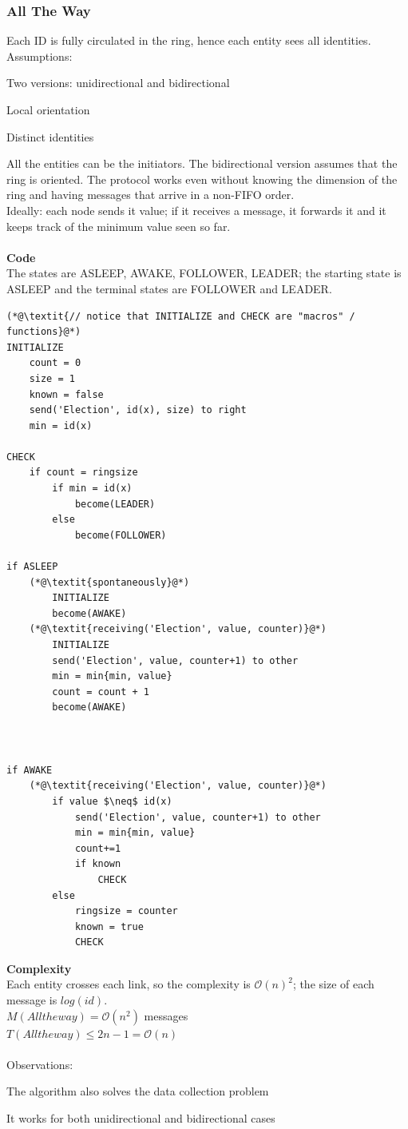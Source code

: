 \documentclass[paper=a4, fontsize=11pt]{scrartcl} %
\numberwithin{equation}{section} %
\numberwithin{figure}{section} %
\numberwithin{table}{section} %
\begin{document}
\subsubsection*{All The Way}
Each ID is fully circulated in the ring, hence each entity sees all identities.
\\
Assumptions:
\begin{compactitem}
\item Two versions: unidirectional and bidirectional
\item Local orientation
\item Distinct identities
\end{compactitem}
All the entities can be the initiators. The bidirectional version assumes that the ring is oriented. The protocol works even without knowing the dimension of the ring and having messages that arrive in a non-FIFO order. \\ 
Ideally: each node sends it value; if it receives a message, it forwards it and it keeps track of the minimum value seen so far.\\ \\
\textbf{Code}\\The states are ASLEEP, AWAKE, FOLLOWER, LEADER; the starting state is ASLEEP and the terminal states are FOLLOWER and LEADER. 
\begin{lstlisting}
(*@\textit{// notice that INITIALIZE and CHECK are "macros" / functions}@*)
INITIALIZE
	count = 0
	size = 1
	known = false
	send('Election', id(x), size) to right
	min = id(x)

CHECK
	if count = ringsize
		if min = id(x)
			become(LEADER)
		else
			become(FOLLOWER)										

if ASLEEP
	(*@\textit{spontaneously}@*)
		INITIALIZE
		become(AWAKE)
	(*@\textit{receiving('Election', value, counter)}@*)
		INITIALIZE
		send('Election', value, counter+1) to other
		min = min{min, value}
		count = count + 1
		become(AWAKE)



if AWAKE
	(*@\textit{receiving('Election', value, counter)}@*)
		if value $\neq$ id(x)
			send('Election', value, counter+1) to other
			min = min{min, value}
			count+=1
			if known 
				CHECK
		else
			ringsize = counter
			known = true
			CHECK
\end{lstlisting}
\textbf{Complexity}\\
Each entity crosses each link, so the complexity is $\mathcal{O}(n)^2$; the size of each message is $log(id)$.\\
$M(Alltheway) =\mathcal{O}(n^2)$ messages \\
$T(Alltheway) \leq 2n-1 = \mathcal{O}(n)$ \\ \\
Observations:
\begin{compactitem}
\item The algorithm also solves the data collection problem
\item It works for both unidirectional and bidirectional cases
\end{compactitem}
~ \\
\end{document}
